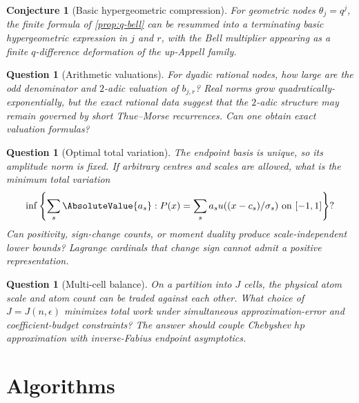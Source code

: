 \documentclass[11pt,oneside]{article}
\newtheorem{conjecture}[theorem]{Conjecture}
\newtheorem{question}[theorem]{Question}
\theoremstyle{definition}
\theoremstyle{remark}
\newcommand{\1}{\mathbf{1}}
\begin{document}
\begin{conjecture}[Basic hypergeometric compression]
\label{conj:q-hyper}
For geometric nodes $\theta_j=q^j$, the finite formula of
\cref{prop:q-bell} can be resummed into a terminating basic hypergeometric
expression in $j$ and $r$, with the Bell multiplier appearing as a finite
$q$-difference deformation of the up-Appell family.
\end{conjecture}

\begin{question}[Arithmetic valuations]
For dyadic rational nodes, how large are the odd denominator and $2$-adic
valuation of $b_{j,r}$?  Real norms grow quadratically-exponentially, but the
exact rational data suggest that the $2$-adic structure may remain governed
by short Thue--Morse recurrences.  Can one obtain exact valuation formulas?
\end{question}

\begin{question}[Optimal total variation]
The endpoint basis is unique, so its amplitude norm is fixed.  If arbitrary
centres and scales are allowed, what is the minimum total variation
\[
 \inf\left\{\sum_s\AbsoluteValue{a_s}:P(x)=\sum_sa_su((x-c_s)/\sigma_s)
 \text{ on }[-1,1]\right\}?
\]
Can positivity, sign-change counts, or moment duality produce scale-independent
lower bounds?  Lagrange cardinals that change sign cannot admit a positive
representation.
\end{question}

\begin{question}[Multi-cell balance]
On a partition into $J$ cells, the physical atom scale and atom count can be
traded against each other.  What choice of $J=J(n,\epsilon)$ minimizes total
work under simultaneous approximation-error and coefficient-budget
constraints?  The answer should couple Chebyshev $hp$ approximation with
inverse-Fabius endpoint asymptotics.
\end{question}

\section{Algorithms}
\label{sec:algorithms}
\end{document}
